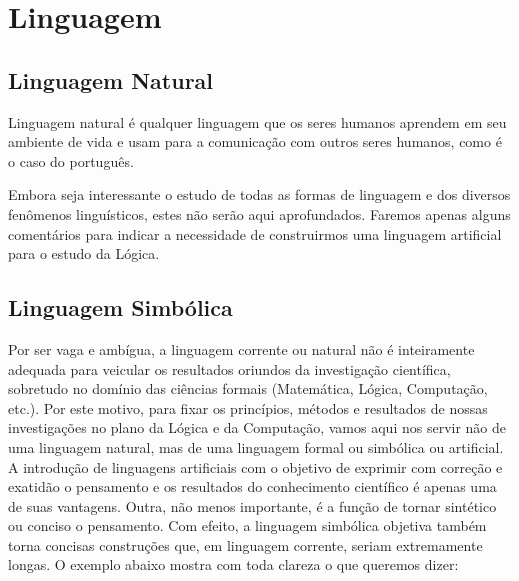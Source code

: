 \documentclass[
	14pt,				%
	twoside,			%
	a4paper,			%
	english,			%
	french,				%
	spanish,			%
	brazil,				%
    ]{abntex2}
\begin{document}
\pagestyle{plain}

\chapter{Linguagem}
\section{Linguagem Natural}

\thispagestyle{plain}


Linguagem natural é qualquer linguagem que os seres humanos aprendem em seu
ambiente de vida e usam para a comunicação com outros seres humanos, como é o
caso do português.

Embora seja interessante o estudo de todas as formas de linguagem e dos diversos
fenômenos linguísticos, estes não serão aqui aprofundados. Faremos apenas alguns
comentários para indicar a necessidade de construirmos uma linguagem artificial
para o estudo da Lógica.

\newpage

\lipsum[50]

\lipsum[50]

\lipsum[50]

\lipsum[50]

\newpage

\section{Linguagem Simbólica}
Por ser vaga e ambígua, a linguagem corrente ou natural não é inteiramente adequada para veicular os resultados oriundos da investigação científica, sobretudo no domínio das ciências formais (Matemática, Lógica, Computação, etc.).
Por este motivo, para fixar os princípios, métodos e resultados de nossas investigações no plano da Lógica e da Computação, vamos aqui nos servir não de uma linguagem natural, mas de uma linguagem formal ou simbólica ou artificial.
A introdução de linguagens artificiais com o objetivo de exprimir com correção e exatidão o pensamento e os resultados do conhecimento científico é apenas uma de suas vantagens.
Outra, não menos importante, é a função de tornar sintético ou conciso o pensamento.
Com efeito, a linguagem simbólica objetiva também torna concisas construções que, em linguagem corrente, seriam extremamente longas.
O exemplo abaixo mostra com toda clareza o que queremos dizer:
\end{document}
